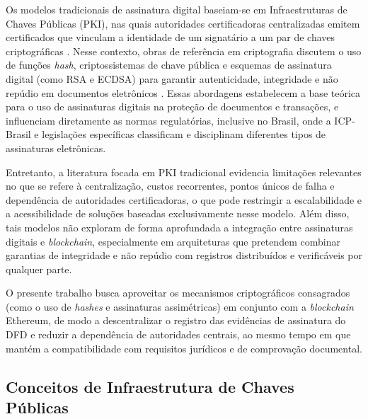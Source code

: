 \documentclass[
    12pt,
    a4paper,
    oneside,
    chapter=TITLE,
    section=TITLE,
    subsection=TITLE,
    subsubsection=TITLE,
    sumario=tradicional,
    english,
    brazil
]{abntex2}
\begin{document}
Os modelos tradicionais de assinatura digital baseiam-se em
Infraestruturas de Chaves Públicas (PKI), nas quais autoridades
certificadoras centralizadas emitem certificados que vinculam a
identidade de um signatário a um par de chaves criptográficas
\cite{cooper2008}. Nesse contexto, obras de referência em criptografia
discutem o uso de funções \emph{hash}, criptossistemas de chave pública
e esquemas de assinatura digital (como RSA e ECDSA) para garantir
autenticidade, integridade e não repúdio em documentos eletrônicos
\cite{stallings2017}. Essas abordagens
estabelecem a base teórica para o uso de assinaturas digitais na
proteção de documentos e transações, e influenciam diretamente as
normas regulatórias, inclusive no Brasil, onde a ICP-Brasil e
legislações específicas classificam e disciplinam diferentes tipos de
assinaturas eletrônicas.

Entretanto, a literatura focada em PKI tradicional evidencia
limitações relevantes no que se refere à centralização, custos
recorrentes, pontos únicos de falha e dependência de autoridades
certificadoras, o que pode restringir a escalabilidade e a
acessibilidade de soluções baseadas exclusivamente nesse modelo. Além
disso, tais modelos não exploram de forma aprofundada a integração
entre assinaturas digitais e \emph{blockchain}, especialmente em
arquiteturas que pretendem combinar garantias de integridade e não
repúdio com registros distribuídos e verificáveis por qualquer parte.

O presente trabalho busca aproveitar os mecanismos criptográficos
consagrados (como o uso de \emph{hashes} e assinaturas assimétricas)
em conjunto com a \emph{blockchain} Ethereum, de modo a descentralizar
o registro das evidências de assinatura do DFD e reduzir a
dependência de autoridades centrais, ao mesmo tempo em que mantém a
compatibilidade com requisitos jurídicos e de comprovação documental.

\subsection{Conceitos de Infraestrutura de Chaves Públicas}
\end{document}
